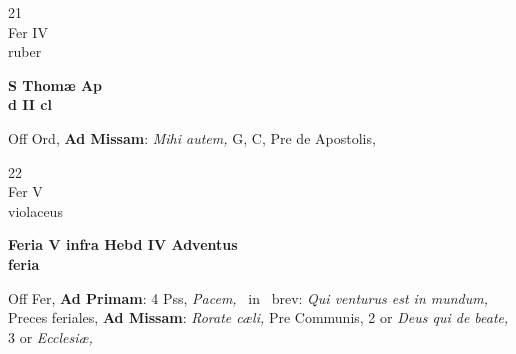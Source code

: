 \documentclass[10pt, openany]{book}
\begin{document}
        \begin{center}
            \begin{minipage}{3.5in}
                \vspace{2em}
                \begin{minipage}{0.5in}
                    {\Huge 21} \\
                    {\normalsize Fer IV} \\
                    {\normalsize ruber}
                \end{minipage}
                \begin{minipage}{3.0in}
                    \textbf{ \large S Thomæ Ap \\
                    \textnormal{\normalsize d II cl}} \\ 
                \end{minipage}
                \begin{justify}Off Ord, \textbf{Ad Missam}: \textit{Mihi autem,} G, C, Pre de Apostolis,  
                \end{justify}
            \end{minipage}
        \end{center}
    
        \begin{center}
            \begin{minipage}{3.5in}
                \vspace{2em}
                \begin{minipage}{0.5in}
                    {\Huge 22} \\
                    {\normalsize Fer V} \\
                    {\normalsize violaceus}
                \end{minipage}
                \begin{minipage}{3.0in}
                    \textbf{ \large Feria V infra Hebd IV Adventus \\
                    \textnormal{\normalsize feria}} \\ 
                \end{minipage}
                \begin{justify}Off Fer, \textbf{Ad Primam}: 4 Pss, \textit{Pacem,} \Vbar\ in \Rbar\ brev: \textit{Qui venturus est in mundum,} Preces feriales, \textbf{Ad Missam}: \textit{Rorate cæli,} Pre Communis, 2 or \textit{Deus qui de beate,} 3 or \textit{Ecclesiæ,}  
                \end{justify}
            \end{minipage}
        \end{center}
    
\end{document}
